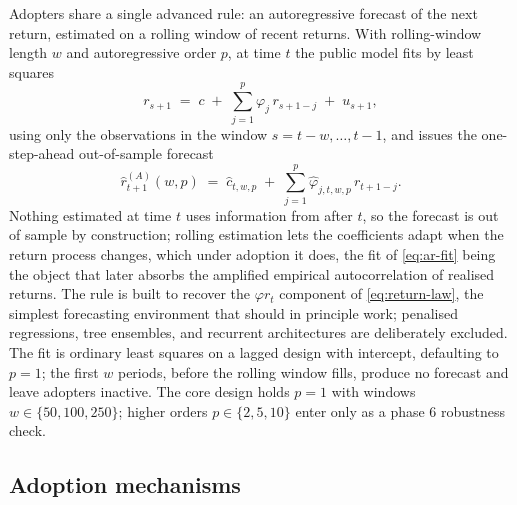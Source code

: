 \documentclass[12pt]{article}
\begin{document}
Adopters share a single advanced rule: an autoregressive forecast of the next return, estimated on a rolling window of recent returns. With rolling-window length $w$ and autoregressive order $p$, at time $t$ the public model fits by least squares %
\begin{equation}
  r_{s+1} \;=\; c \;+\; \sum_{j=1}^{p} \varphi_{j}\, r_{s+1-j} \;+\; u_{s+1},
  \label{eq:ar-fit}
\end{equation}
using only the observations in the window $s = t - w, \ldots, t - 1$, and issues the one-step-ahead out-of-sample forecast
\begin{equation}
  \hat{r}_{t+1}^{(A)}(w, p) \;=\; \hat{c}_{t, w, p} \;+\; \sum_{j=1}^{p} \hat{\varphi}_{j, t, w, p}\, r_{t+1-j}.
  \label{eq:ar-forecast}
\end{equation}
Nothing estimated at time $t$ uses information from after $t$, so the forecast is out of sample by construction; rolling estimation lets the coefficients adapt when the return process changes, which under adoption it does, the fit of \eqref{eq:ar-fit} being the object that later absorbs the amplified empirical autocorrelation of realised returns. %
The rule is built to recover the $\varphi r_t$ component of \eqref{eq:return-law}, the simplest forecasting environment that should in principle work; penalised regressions, tree ensembles, and recurrent architectures are deliberately excluded. The fit is ordinary least squares on a lagged design with intercept, defaulting to $p = 1$; the first $w$ periods, before the rolling window fills, produce no forecast and leave adopters inactive. The core design holds $p = 1$ with windows $w \in \{50, 100, 250\}$; higher orders $p \in \{2, 5, 10\}$ enter only as a phase 6 robustness check. %

\subsection{Adoption mechanisms}\label{sec:model-adoption}
\end{document}
